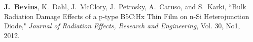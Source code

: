 \begin{bibsection}
%
  
  

\item \textbf{J.\ Bevins}, K.\ Dahl, J.\ McClory, J.\ Petrosky, A.\ Caruso, and S.\ Karki, ``Bulk Radiation Damage Effects of a p-type B5C:Hx Thin Film on n-Si Heterojunction Diode," \textit{Journal of Radiation Effects, Research and Engineering}, Vol. 30, No1, 2012.
  
%
%  


\end{bibsection}
